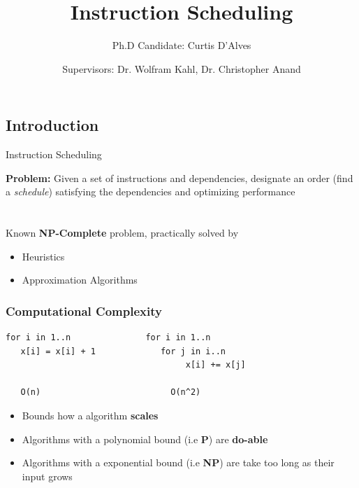 \documentclass{beamer}
\title{\normalsize Instruction Scheduling} %
\subtitle{Ph.D Candidate: Curtis D'Alves} %
\author{Supervisors: Dr. Wolfram Kahl, Dr. Christopher Anand}
\begin{document}
  \frame{\maketitle}


  \begin{darkframes}


    \section{Introduction}
\begin{frame}{Instruction Scheduling}

	{\color{cyan} \bf Problem:} Given a set of instructions and dependencies, designate an order (find a {\it schedule}) satisfying the dependencies and optimizing performance
	\pause
	\qquad \\
	\qquad \\
	\qquad \\
	Known {\bf \color{green} NP-Complete} problem, practically solved by
	\begin{itemize}
		\item Heuristics
		\item Approximation Algorithms
	\end{itemize}
\end{frame}      

\begin{frame}[fragile]
  \frametitle{Computational Complexity}
\begin{lstlisting}
for i in 1..n               for i in 1..n
   x[i] = x[i] + 1             for j in i..n
                                    x[i] += x[j]

   O(n)                          O(n^2)
\end{lstlisting}
  \begin{itemize}
  \item Bounds how a algorithm {\bf \color{green} scales}
  \item Algorithms with a polynomial bound (i.e {\bf \color{cyan} P}) are {\bf \color{green} do-able}
  \item Algorithms with a exponential bound (i.e {\bf \color{cyan} NP}) are take too long as their input grows
  \end{itemize}
\end{frame}


\end{darkframes}
\end{document}
